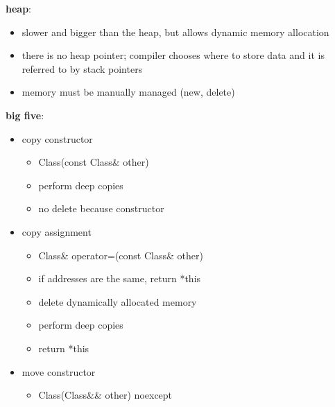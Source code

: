 \documentclass{article}
\begin{document}
\noindent
\textbf{heap}:
\begin{itemize}
    \vspace{-.8\baselineskip}
    \item slower and bigger than the heap, but allows dynamic memory allocation
    \vspace{-.8\baselineskip}
    \item there is no heap pointer; compiler chooses where to store data and it is referred to by stack pointers
    \vspace{-.8\baselineskip}
    \item memory must be manually managed (new, delete)
    \vspace{-.8\baselineskip}
\end{itemize}

\noindent
\begin{multicols}{2}
\textbf{big five}:
\vspace{-.7\baselineskip}
\begin{itemize}
    \item copy constructor
    \vspace{-.7\baselineskip}
        \begin{itemize}
            \item Class(const Class\& other)
            \item perform deep copies
            \item no delete because constructor
        \end{itemize}
    \vspace{-\baselineskip}
    \item copy assignment
    \vspace{-.7\baselineskip}
        \begin{itemize}
            \item Class\& operator=(const Class\& other)
            \item if addresses are the same, return *this
            \item delete dynamically allocated memory
            \item perform deep copies
            \item return *this
        \end{itemize}
    \vspace{-\baselineskip}
    \item move constructor
    \vspace{-.7\baselineskip}
        \begin{itemize}
            \item Class(Class\&\& other) noexcept

\end{itemize}
\end{itemize}
\end{multicols}
\end{document}
